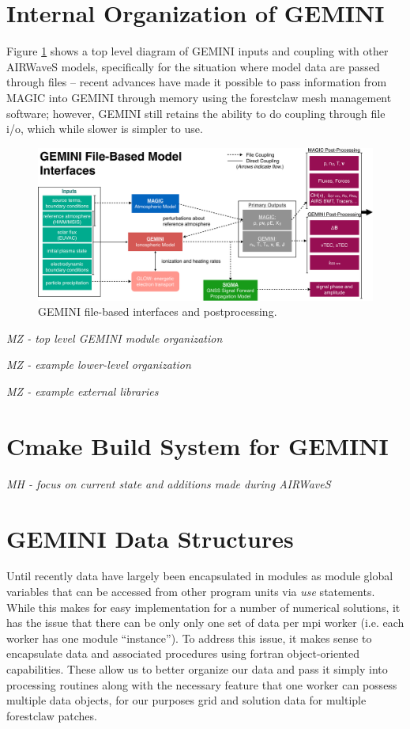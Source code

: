 \documentclass[11pt,letterpaper]{article}
\begin{document}
\section{Internal Organization of GEMINI}

Figure \ref{fig:org} shows a top level diagram of GEMINI inputs and coupling with other AIRWaveS models, specifically for the situation where model data are passed through files -- recent advances have made it possible to pass information from MAGIC into GEMINI through memory using the forestclaw mesh management software; however, GEMINI still retains the ability to do coupling through file i/o, which while slower is simpler to use.  
\begin{figure}
  \centering
  \includegraphics[width=\textwidth]{./figures/GEMINI_org-crop.pdf}
  \caption{GEMINI file-based interfaces and postprocessing.} \label{fig:org}
\end{figure}

\emph{MZ - top level GEMINI module organization}

\emph{MZ - example lower-level organization}

\emph{MZ - example external libraries}


\section{Cmake Build System for GEMINI}

\emph{MH - focus on current state and additions made during AIRWaveS}



\section{GEMINI Data Structures}

Until recently data have largely been encapsulated in modules as module global variables that can be accessed from other program units via \emph{use} statements.  While this makes for easy implementation for a number of numerical solutions, it has the issue that there can be only only one set of data per mpi worker (i.e. each worker has one module ``instance'').  To address this issue, it makes sense to encapsulate data and associated procedures using fortran object-oriented capabilities.  These allow us to better organize our data and pass it simply into processing routines along with the necessary feature that one worker can possess multiple data objects, for our purposes  grid and solution data for multiple forestclaw patches.  
\end{document}
